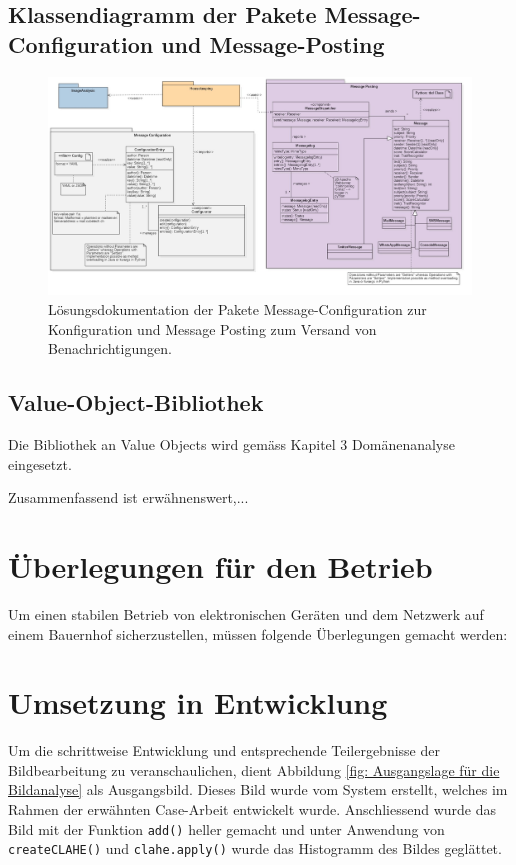 \begin{landscape}
\subsection{Klassendiagramm der Pakete Message-Configuration und Message-Posting}
\begin{figure}[H]
	\center
	\includegraphics[scale=0.43]{Grafiken/modelle/solution-messaging.jpg}
	\caption{Lösungsdokumentation der Pakete Message-Configuration zur Konfiguration und Message Posting zum Versand von Benachrichtigungen.} 
	\label{fig: Lösungsdokumentation der Pakete Message-Configuration zur Konfiguration und Message Posting zum Versand von Benachrichtigungen.}
\end{figure}

\subsection{Value-Object-Bibliothek}
Die Bibliothek an Value Objects wird gemäss Kapitel 3 Domänenanalyse eingesetzt.

Zusammenfassend ist erwähnenswert,... 

\end{landscape}
\restoregeometry %

\section{Überlegungen für den Betrieb}

Um einen stabilen Betrieb von elektronischen Geräten und dem Netzwerk auf einem Bauernhof sicherzustellen, müssen folgende Überlegungen gemacht werden:


\newpage


\section{Umsetzung in Entwicklung}
Um die schrittweise Entwicklung und entsprechende Teilergebnisse der Bildbearbeitung zu veranschaulichen, dient Abbildung \ref{fig: Ausgangslage für die Bildanalyse} als Ausgangsbild. Dieses Bild wurde vom System erstellt, welches im Rahmen der erwähnten Case-Arbeit entwickelt wurde. Anschliessend wurde das Bild mit der Funktion \texttt{add()} heller gemacht und unter Anwendung von \texttt{createCLAHE()} und \texttt{clahe.apply()} wurde das Histogramm des Bildes geglättet. 

